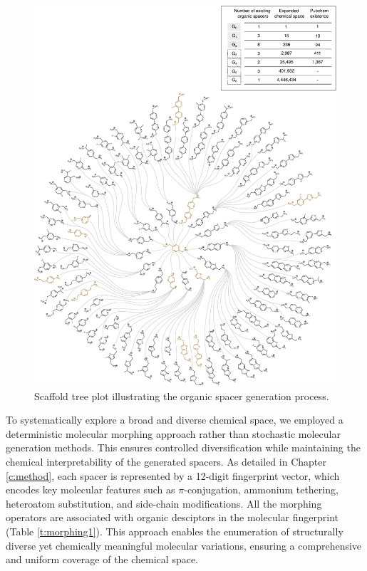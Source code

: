 \begin{figure}[htbp]
    \centering
    \includegraphics[width=\textwidth]{figures/HT-ML/figure4-1.pdf}
    \caption{Scaffold tree plot illustrating the organic spacer generation process.}
    \label{fig:figure4.1}
\end{figure}

To systematically explore a broad and diverse chemical space, we employed a deterministic molecular morphing approach rather than stochastic molecular generation methods\cite{RN236,RN310}. This ensures controlled diversification while maintaining the chemical interpretability of the generated spacers. As detailed in Chapter \ref{c:method}, each spacer is represented by a 12-digit fingerprint vector, which encodes key molecular features such as $\pi$-conjugation, ammonium tethering, heteroatom substitution, and side-chain modifications. All the morphing operators are associated with organic desciptors in the molecular fingerprint (Table \ref{t:morphing1}). This approach enables the enumeration of structurally diverse yet chemically meaningful molecular variations, ensuring a comprehensive and uniform coverage of the chemical space.

